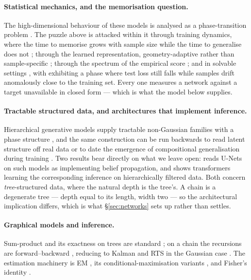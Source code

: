 \documentclass{article}
\theoremstyle{definition}
\theoremstyle{plain}
\begin{document}
\paragraph{Statistical mechanics, and the memorisation question.} The high-dimensional behaviour of
these models is analysed as a phase-transition problem \citep{biroli2023generative,biroli2024dynamical,
achilli2026speciation}. The puzzle above is attacked within it through training dynamics, where the
time to memorise grows with sample size while the time to generalise does not
\citep{bonnaire2025memorize,favero2025bigger}; through the learned representation, geometry-adaptive
rather than sample-specific \citep{kadkhodaie2024generalization}; through the spectrum of the
empirical score \citep{achilli2024losing}; and in solvable settings
\citep{cui2025solvable,raya2023spontaneous,ghio2024sampling}, with
\citet{garnierbrun2026biased} exhibiting a phase where test loss still falls while samples drift
anomalously close to the training set. Every one measures a network against a target unavailable in
closed form --- which is what the model below supplies.

\paragraph{Tractable structured data, and architectures that implement inference.} Hierarchical
generative models supply tractable non-Gaussian families with a phase structure
\citep{sclocchi2025phase}, and the same construction can be run backwards to read latent structure
off real data \citep{sclocchi2025probing} or to date the emergence of compositional generalisation
during training \citep{favero2025compositional}. Two results bear directly on what we leave open:
\citet{mei2024unets}
reads U-Nets on such models as implementing belief propagation, and
\citet{garnierbrun2024transformers} shows transformers learning the corresponding inference on
hierarchically filtered data. Both concern \emph{tree}-structured data, where the natural depth is
the tree's. A chain is a degenerate tree --- depth equal to its length, width two --- so the
architectural implication differs, which is what \S\ref{sec:networks} sets up rather than settles.

\paragraph{Graphical models and inference.} Sum-product and its exactness on trees are standard
\citep{pearl1988,kschischang2001factor,mezard2009information,wainwright2008}; on a chain the recursions are
forward--backward \citep{baum1970,rabiner1989tutorial}, reducing to Kalman and RTS in the Gaussian case
\citep{kalman1960new,rauch1965maximum}. The estimation machinery is EM \citep{dempster1977maximum}, its
conditional-maximisation variants \citep{wu1983,meng1993maximum}, and Fisher's identity
\citep{fisher1925,louis1982,cappe2005}.
\end{document}
